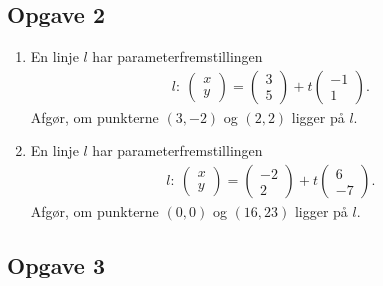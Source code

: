 \subsection*{Opgave 2}
\begin{enumerate}[label=\roman*)]
	\item En linje $l$ har parameterfremstillingen
	\begin{align*}
		l: \ 
		\begin{pmatrix}
			x \\ y
		\end{pmatrix}=
		\begin{pmatrix}
			3 \\5
		\end{pmatrix} + t
		\begin{pmatrix}
			-1 \\ 1
		\end{pmatrix}.
	\end{align*}
	Afgør, om punkterne $(3,-2)$ og $(2,2)$ ligger på $l$. 
	\item En linje $l$ har parameterfremstillingen
	\begin{align*}
		l: \ 
		\begin{pmatrix}
			x \\ y
		\end{pmatrix}=
		\begin{pmatrix}
			-2 \\2
		\end{pmatrix} + t
		\begin{pmatrix}
			6 \\ -7  
		\end{pmatrix}.
	\end{align*}
	Afgør, om punkterne $(0,0)$ og $(16,23)$ ligger på $l$. 
\end{enumerate}

\subsection*{Opgave 3}

